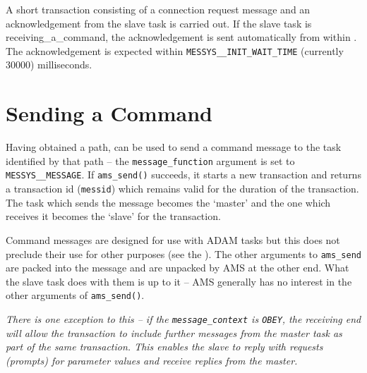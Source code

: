 \documentclass[twoside,11pt,nolof]{starlink}
\begin{document}
A short transaction consisting of a connection request message and an
acknowledgement from the slave task is carried out.
If the slave task is
{receiving_a_command},
the acknowledgement is sent automatically from within
.
The acknowledgement is expected within \texttt{MESSYS\_\_INIT\_WAIT\_TIME}
(currently 30000) milliseconds.

\section{\label{sending_a_command}Sending a Command}
Having obtained a path,
can be used to send a command message to the task identified by that path --
the \texttt{message\_function} argument is set to \texttt{MESSYS\_\_MESSAGE}.
If \texttt{ams\_send()} succeeds, it starts a new transaction and returns
a transaction id (\texttt{messid}) which remains valid for the duration of the
transaction. The task which sends the message becomes the `master' and
the one which receives it becomes the `slave' for the transaction.

Command messages are designed for use with ADAM tasks but this does not
preclude their use for other purposes (see the
).
The other arguments to \texttt{ams\_send} are packed into the message and are
unpacked by AMS at the other end.
What the slave task does with them is up to it -- AMS generally has no
interest in the other arguments of \texttt{ams\_send()}.

\emph{There is one exception to this -- if the \texttt{message\_context} is
\texttt{OBEY}, the receiving end will allow the transaction to include further
messages from the master task  as part of the same transaction.
This enables the slave to reply with requests (prompts) for parameter values
and receive replies from the master.}
\end{document}
